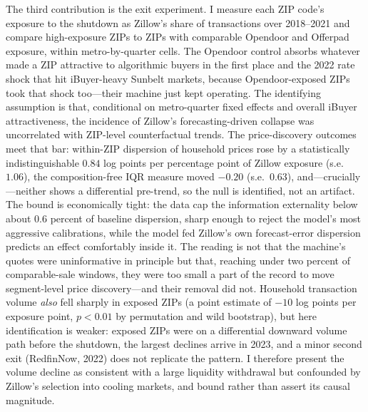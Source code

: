 \documentclass[12pt, letterpaper]{article}
\theoremstyle{remark}
\begin{document}
The third contribution is the exit experiment. I measure each ZIP code's exposure to the shutdown as Zillow's share of transactions over 2018--2021 and compare high-exposure ZIPs to ZIPs with comparable Opendoor and Offerpad exposure, within metro-by-quarter cells. The Opendoor control absorbs whatever made a ZIP attractive to algorithmic buyers in the first place and the 2022 rate shock that hit iBuyer-heavy Sunbelt markets, because Opendoor-exposed ZIPs took that shock too---their machine just kept operating. The identifying assumption is that, conditional on metro-quarter fixed effects and overall iBuyer attractiveness, the incidence of Zillow's forecasting-driven collapse was uncorrelated with ZIP-level counterfactual trends. The price-discovery outcomes meet that bar: within-ZIP dispersion of household prices rose by a statistically indistinguishable $0.84$ log points per percentage point of Zillow exposure (s.e.\ $1.06$), the composition-free IQR measure moved $-0.20$ (s.e.\ $0.63$), and---crucially---neither shows a differential pre-trend, so the null is identified, not an artifact. The bound is economically tight: the data cap the information externality below about $0.6$ percent of baseline dispersion, sharp enough to reject the model's most aggressive calibrations, while the model fed Zillow's own forecast-error dispersion predicts an effect comfortably inside it. The reading is not that the machine's quotes were uninformative in principle but that, reaching under two percent of comparable-sale windows, they were too small a part of the record to move segment-level price discovery---and their removal did not. Household transaction volume \emph{also} fell sharply in exposed ZIPs (a point estimate of $-10$ log points per exposure point, $p < 0.01$ by permutation and wild bootstrap), but here identification is weaker: exposed ZIPs were on a differential downward volume path before the shutdown, the largest declines arrive in 2023, and a minor second exit (RedfinNow, 2022) does not replicate the pattern. I therefore present the volume decline as consistent with a large liquidity withdrawal but confounded by Zillow's selection into cooling markets, and bound rather than assert its causal magnitude.
\end{document}
